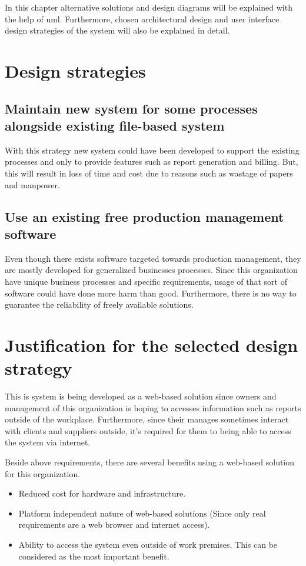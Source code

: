 \documentclass[12pt]{report}
\begin{document}
In this chapter alternative solutions and design diagrams will be explained with the help of \acrshort{uml}. Furthermore, chosen architectural design and user interface design strategies of the system will also be explained in detail.

\section{Design strategies}

\subsection{Maintain new system for some processes alongside existing file-based system}
With this strategy new system could have been developed to support the existing processes and only to provide features such as report generation and billing. But, this will result in loss of time and cost due to reasons such as wastage of papers and manpower.

\subsection{Use an existing free production management software}
Even though there exists software targeted towards production management, they are mostly developed for generalized businesses processes. Since this organization have unique business processes and specific requirements, usage of that sort of software could have done more harm than good. Furthermore, there is no way to guarantee the reliability of freely available solutions.

\section{Justification for the selected design strategy}
This is system is being developed as a web-based solution since owners and management of this organization is hoping to accesses information such as reports outside of the workplace. Furthermore, since their manages sometimes interact with clients and suppliers outside, it’s required for them to being able to access the system via internet.

Beside above requirements, there are several benefits using a web-based solution for this organization.

\begin{itemize}
	\item Reduced cost for hardware and infrastructure.

	\item Platform independent nature of web-based solutions (Since only real requirements are a web browser and internet access).

	\item Ability to access the system even outside of work premises. This can be considered as the most important benefit.
\end{itemize}
\end{document}
